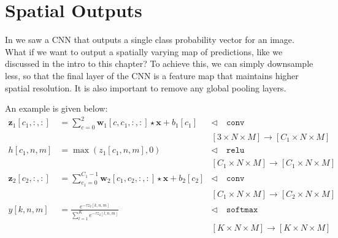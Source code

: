 \section{Spatial Outputs}\label{sec:convolutional_neural_networks:spatial_outputs}
In \sect{\ref{sec:convolutional_neural_nets:simple_CNN}} we saw a CNN that outputs a single class probability vector for an image. What if we want to output a spatially varying map of predictions, like we discussed in the intro to this chapter? To achieve this, we can simply downsample less, so that the final layer of the CNN is a feature map that maintains higher spatial resolution. It is also important to remove any global pooling layers.

An example is given below:
\begin{align}
    \mathbf{z}_1[c_1,:,:] &= \sum_{c=0}^2 \mathbf{w}_1[c,c_1,:,:] \star \mathbf{x} + b_1[c_1]  &\triangleleft \quad \texttt{conv}\\
    &&[3 \times N \times M] \rightarrow [C_1 \times N \times M]\nonumber\\
    h[c_1,n,m] &= \max(z_1[c_1,n,m],0) &\triangleleft \quad \texttt{relu}\\
    &&[C_1 \times N \times M] \rightarrow [C_1 \times N \times M]\nonumber\\
    \mathbf{z}_2[c_2,:,:] &= \sum_{c_1=0}^{C_1-1} \mathbf{w}_2[c_1,c_2,:,:] \star \mathbf{x} + b_2[c_2] &\triangleleft \quad \texttt{conv}\\
    &&[C_1 \times N \times M] \rightarrow [C_2 \times N \times M]\nonumber\\
    y[k,n,m] &= \frac{e^{-\tau z_2[k,n,m]}}{\sum_{l=1}^K e^{-\tau z_2[l,n,m]}} &\triangleleft \quad \texttt{softmax}\\
    &&[K \times N \times M] \rightarrow [K \times N \times M]\nonumber
\end{align}


